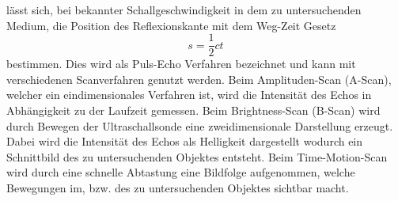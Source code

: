 lässt sich, bei bekannter Schallgeschwindigkeit in dem zu untersuchenden Medium, die Position des Reflexionskante mit dem Weg-Zeit Gesetz
\begin{equation}
  s=\frac{1}{2}ct
  \label{eqn:wegzeit}
\end{equation}
bestimmen. Dies wird als Puls-Echo Verfahren bezeichnet und kann mit verschiedenen Scanverfahren genutzt werden. Beim Amplituden-Scan (A-Scan), welcher ein eindimensionales Verfahren ist, wird die
Intensität des Echos in Abhängigkeit zu der Laufzeit gemessen. Beim Brightness-Scan (B-Scan) wird durch Bewegen der Ultraschallsonde eine zweidimensionale Darstellung erzeugt.
Dabei wird die Intensität des Echos als Helligkeit dargestellt wodurch ein Schnittbild des zu untersuchenden Objektes entsteht. Beim Time-Motion-Scan wird durch eine schnelle Abtastung
eine Bildfolge aufgenommen, welche Bewegungen im, bzw. des zu untersuchenden Objektes sichtbar macht.
